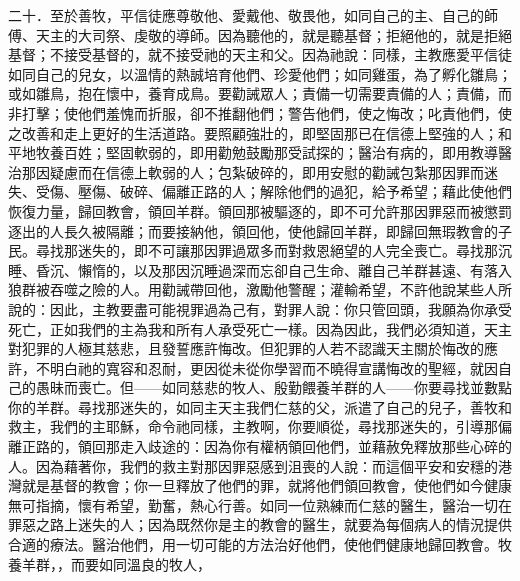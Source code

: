 二十．至於善牧，平信徒應尊敬他、愛戴他、敬畏他，如同自己的主、自己的師傅、天主的大司祭、虔敬的導師。因為聽他的，就是聽基督；拒絕他的，就是拒絕基督；不接受基督的，就不接受祂的天主和父。因為祂說：同樣，主教應愛平信徒如同自己的兒女，以溫情的熱誠培育他們、珍愛他們；如同雞蛋，為了孵化雛鳥；或如雛鳥，抱在懷中，養育成鳥。要勸誡眾人；責備一切需要責備的人；責備，而非打擊；使他們羞愧而折服，卻不推翻他們；警告他們，使之悔改；叱責他們，使之改善和走上更好的生活道路。要照顧強壯的，即堅固那已在信德上堅強的人；和平地牧養百姓；堅固軟弱的，即用勸勉鼓勵那受試探的；醫治有病的，即用教導醫治那因疑慮而在信德上軟弱的人；包紮破碎的，即用安慰的勸誡包紮那因罪而迷失、受傷、壓傷、破碎、偏離正路的人；解除他們的過犯，給予希望；藉此使他們恢復力量，歸回教會，領回羊群。領回那被驅逐的，即不可允許那因罪惡而被懲罰逐出的人長久被隔離；而要接納他，領回他，使他歸回羊群，即歸回無瑕教會的子民。尋找那迷失的，即不可讓那因罪過眾多而對救恩絕望的人完全喪亡。尋找那沉睡、昏沉、懶惰的，以及那因沉睡過深而忘卻自己生命、離自己羊群甚遠、有落入狼群被吞噬之險的人。用勸誡帶回他，激勵他警醒；灌輸希望，不許他說某些人所說的：因此，主教要盡可能視罪過為己有，對罪人說：你只管回頭，我願為你承受死亡，正如我們的主為我和所有人承受死亡一樣。因為因此，我們必須知道，天主對犯罪的人極其慈悲，且發誓應許悔改。但犯罪的人若不認識天主關於悔改的應許，不明白祂的寬容和忍耐，更因從未從你學習而不曉得宣講悔改的聖經，就因自己的愚昧而喪亡。但——如同慈悲的牧人、殷勤餵養羊群的人——你要尋找並數點你的羊群。尋找那迷失的，如同主天主我們仁慈的父，派遣了自己的兒子，善牧和救主，我們的主耶穌，命令祂同樣，主教啊，你要順從，尋找那迷失的，引導那偏離正路的，領回那走入歧途的：因為你有權柄領回他們，並藉赦免釋放那些心碎的人。因為藉著你，我們的救主對那因罪惡感到沮喪的人說：而這個平安和安穩的港灣就是基督的教會；你一旦釋放了他們的罪，就將他們領回教會，使他們如今健康無可指摘，懷有希望，勤奮，熱心行善。如同一位熟練而仁慈的醫生，醫治一切在罪惡之路上迷失的人；因為既然你是主的教會的醫生，就要為每個病人的情況提供合適的療法。醫治他們，用一切可能的方法治好他們，使他們健康地歸回教會。牧養羊群，，而要如同溫良的牧人，\par

